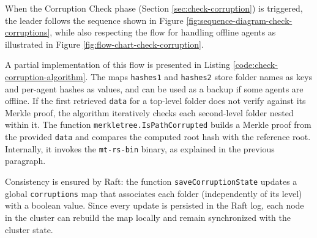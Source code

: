 When the Corruption Check phase (Section \ref{sec:check-corruption}) is triggered,
the leader follows the sequence shown in Figure
\ref{fig:sequence-diagram-check-corruptions}, while also respecting the flow for
handling offline agents as illustrated in Figure
\ref{fig:flow-chart-check-corruption}.

A partial implementation of this flow is presented in Listing
\ref{code:check-corruption-algorithm}. The maps \texttt{hashes1} and
\texttt{hashes2} store folder names as keys and per-agent hashes as values, and
can be used as a backup if some agents are offline. If the first retrieved
\texttt{data} for a top-level folder does not verify against its Merkle proof,
the algorithm iteratively checks each second-level folder nested within it. The
function \texttt{merkletree.IsPathCorrupted} builds a Merkle proof from the
provided \texttt{data} and compares the computed root hash with the reference
root. Internally, it invokes the \texttt{mt-rs-bin} binary, as explained in the
previous paragraph.

Consistency is ensured by Raft: the function \texttt{saveCorruptionState} updates
a global \texttt{corruptions} map that associates each folder (independently of
its level) with a boolean value. Since every update is persisted in the Raft
log, each node in the cluster can rebuild the map locally and remain synchronized
with the cluster state.

